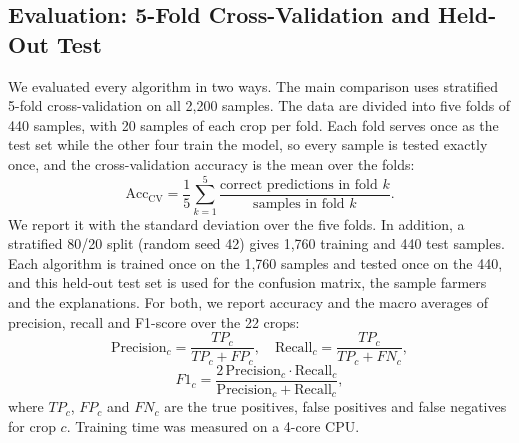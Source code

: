\documentclass[conference]{IEEEtran}
\begin{document}
\subsection{Evaluation: 5-Fold Cross-Validation and Held-Out Test}

We evaluated every algorithm in two ways. The main comparison uses stratified 5-fold cross-validation on all 2,200 samples. The data are divided into five folds of 440 samples, with 20 samples of each crop per fold. Each fold serves once as the test set while the other four train the model, so every sample is tested exactly once, and the cross-validation accuracy is the mean over the folds:
\begin{equation}
\text{Acc}_{\text{CV}} = \frac{1}{5}\sum_{k=1}^{5} \frac{\text{correct predictions in fold } k}{\text{samples in fold } k}.
\end{equation}
We report it with the standard deviation over the five folds. In addition, a stratified 80/20 split (random seed 42) gives 1,760 training and 440 test samples. Each algorithm is trained once on the 1,760 samples and tested once on the 440, and this held-out test set is used for the confusion matrix, the sample farmers and the explanations. For both, we report accuracy and the macro averages of precision, recall and F1-score over the 22 crops:
\begin{equation}
\text{Precision}_c = \frac{TP_c}{TP_c + FP_c}, \quad \text{Recall}_c = \frac{TP_c}{TP_c + FN_c},
\end{equation}
\begin{equation}
F1_c = \frac{2\,\text{Precision}_c \cdot \text{Recall}_c}{\text{Precision}_c + \text{Recall}_c},
\end{equation}
where $TP_c$, $FP_c$ and $FN_c$ are the true positives, false positives and false negatives for crop $c$. Training time was measured on a 4-core CPU.
\end{document}
